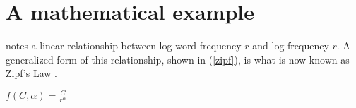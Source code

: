 \documentclass[draft,12pt]{article}
\begin{document}
\section{A mathematical example}

\citet{Zipf1949} notes a linear relationship between log word frequency $r$ and log frequency $r$. A generalized form of this relationship, shown in (\ref{zipf}), is what is now known as Zipf's Law \citep[e.g.,][]{Baroni2009}.

\begin{unlabeledexample} \label{zipf}
$\displaystyle f(C, \alpha) = \frac{C}{r^\alpha}$
\end{unlabeledexample}



\end{document}
